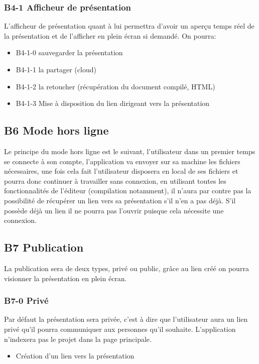 \documentclass[11pt,a4paper]{article}
\begin{document}
\subsubsection{B4-1 Afficheur de présentation}
L'afficheur de présentation quant à lui permettra d'avoir un aperçu temps réel de la présentation et de l'afficher en plein écran si demandé. On pourra:
\begin{itemize}
\item B4-1-0 sauvegarder la présentation
\item B4-1-1 la partager (cloud)
\item B4-1-2 la retoucher (récupération du document compilé, HTML)
\item B4-1-3 Mise à disposition du lien dirigeant vers la présentation
\end{itemize} 

\subsection{B6 Mode hors ligne}
Le principe du mode hors ligne est le suivant, l'utilisateur dans un premier temps se connecte à son compte, l'application va envoyer sur sa machine les fichiers nécessaires, une fois cela fait l'utilisateur disposera en local de ses fichiers et pourra donc continuer à travailler sans connexion, en utilisant toutes les fonctionnalités de l'éditeur (compilation notamment), il n'aura par contre pas la possibilité de récupérer un lien vers sa présentation s'il n'en a pas déjà. S'il possède déjà un lien il ne pourra pas l'ouvrir puisque cela nécessite une connexion.

\subsection{B7 Publication}
La publication sera de deux types, privé ou public, grâce au lien créé on pourra visionner la présentation en plein écran.

\subsubsection{B7-0 Privé}
Par défaut la présentation sera privée, c'est à dire que l'utilisateur aura un lien privé qu'il pourra communiquer aux personnes qu'il souhaite. L'application n'indexera pas le projet dans la page principale.
\begin{itemize}
\item Création d'un lien vers la présentation
\end{itemize}
\end{document}
